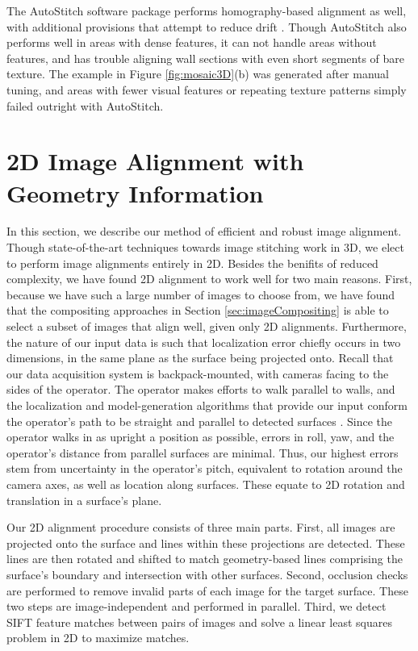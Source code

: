 \documentclass[]{spie}  %
\begin{document}
The AutoStitch software package performs homography-based alignment as
well, with additional provisions that attempt to reduce drift
\cite{panorama2d, autostitch}. Though AutoStitch also performs well in
areas with dense features, it can not handle areas without features,
and has trouble aligning wall sections with even short segments of
bare texture. The example in Figure \ref{fig:mosaic3D}(b) was
generated after manual tuning, and areas with fewer visual features or
repeating texture patterns simply failed outright with AutoStitch.



\section{2D Image Alignment with Geometry Information}
\label{sec:2dAlignment}

In this section, we describe our method of efficient and robust image
alignment. Though state-of-the-art techniques towards image stitching
work in 3D, we elect to perform image alignments entirely in
2D. Besides the benifits of reduced complexity, we have found 2D
alignment to work well for two main reasons. First, because we have
such a large number of images to choose from, we have found that the
compositing approaches in Section \ref{sec:imageCompositing} is able
to select a subset of images that align well, given only 2D
alignments. Furthermore, the nature of our input data is such that
localization error chiefly occurs in two dimensions, in the same plane
as the surface being projected onto. Recall that our data acquisition
system is backpack-mounted, with cameras facing to the sides of the
operator. The operator makes efforts to walk parallel to walls, and
the localization and model-generation algorithms that provide our
input conform the operator's path to be straight and parallel to
detected surfaces \cite{kua2012loopclosure, sanchez2012point}. Since
the operator walks in as upright a position as possible, errors in
roll, yaw, and the operator's distance from parallel surfaces are
minimal. Thus, our highest errors stem from uncertainty in the
operator's pitch, equivalent to rotation around the camera axes, as
well as location along surfaces. These equate to 2D rotation and
translation in a surface's plane.

Our 2D alignment procedure consists of three main parts. First, all
images are projected onto the surface and lines within these
projections are detected. These lines are then rotated and shifted to
match geometry-based lines comprising the surface's boundary and
intersection with other surfaces. Second, occlusion checks are
performed to remove invalid parts of each image for the target
surface. These two steps are image-independent and performed in
parallel. Third, we detect SIFT feature matches between pairs of
images and solve a linear least squares problem in 2D to maximize
matches.
\end{document}
